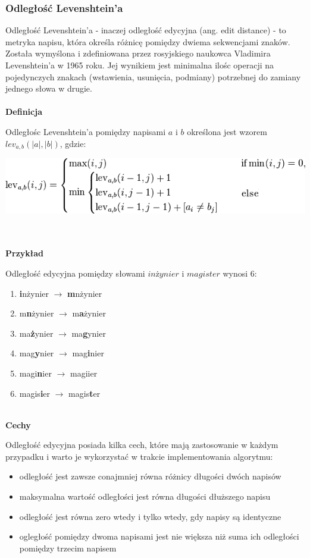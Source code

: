 \documentclass[a4paper,12pt,twoside]{article}
\begin{document}
\newpage

\subsubsection{Odległość Levenshtein'a}

Odległość Levenshtein'a - inaczej odległość edycyjna (ang. edit distance) - to metryka napisu, która określa różnicę pomiędzy dwiema sekwencjami znaków. Została wymyślona i zdefiniowana przez rosyjskiego naukowca Vladimira Levenshtein'a w 1965 roku.
Jej wynikiem jest minimalna ilośc operacji na pojedynczych znakach (wstawienia, usunięcia, podmiany) potrzebnej do zamiany jednego słowa w drugie.
\\ \\
\textbf{Definicja}

Odległośc Levenshtein'a pomiędzy napisami $a$ i $b$ określona jest wzorem $lev_{a,b}(|a|,|b|)$, gdzie:
\begin{center}
\includegraphics[scale=0.7]{gfx/levenshtein_def.png}
\end{center}
\\ \\
\textbf{Przykład}

Odległość edycyjna pomiędzy słowami $inżynier$ i $magister$ wynosi 6:
\begin{enumerate}
\item \textbf{i}nżynier $\rightarrow$ \textbf{m}nżynier
\item m\textbf{n}żynier $\rightarrow$ m\textbf{a}żynier
\item ma\textbf{ż}ynier $\rightarrow$ ma\textbf{g}ynier
\item mag\textbf{y}nier $\rightarrow$ mag\textbf{i}nier
\item magi\textbf{n}ier $\rightarrow$ magiier
\item magis\textbf{i}er $\rightarrow$ magis\textbf{t}er
\end{enumerate}
\pagebreak
\\
\textbf{Cechy}

Odległość edycyjna posiada kilka cech, które mają zastosowanie w każdym przypadku i warto je wykorzystać w trakcie implementowania algorytmu:
\begin{itemize}
\item odległość jest zawsze conajmniej równa różnicy długości dwóch napisów
\item maksymalna wartość odległości jest równa długości dłuższego napisu
\item odległość jest równa zero wtedy i tylko wtedy, gdy napisy są identyczne
\item ogległość pomiędzy dwoma napisami jest nie większa niż suma ich odległości pomiędzy trzecim napisem
\end{itemize}
\end{document}
